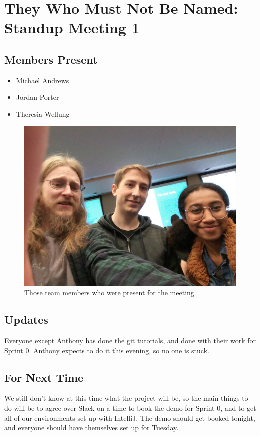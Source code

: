 \documentclass[11pt,letterpaper,oneside]{article}
\begin{document}
\section*{They Who Must Not Be Named: \\ Standup Meeting 1}

\subsection*{Members Present}
\begin{itemize}
\item Michael Andrews
\item Jordan Porter
\item Theresia Wellung
\end{itemize}

\begin{figure}[H]
	\includegraphics[angle=180, width=\linewidth]{20191017_171140.jpg}
	\caption{Those team members who were present for the meeting.}
\end{figure}

\subsection*{Updates}

Everyone except Anthony has done the git tutorials, and done with their work for Sprint 0.  Anthony expects to do it this evening, so no one is stuck.

\subsection*{For Next Time}

We still don't know at this time what the project will be, so the main things to do will be to agree over Slack on a time to book the demo for Sprint 0, and to get all of our environments set up with IntelliJ.  The demo should get booked tonight, and everyone should have themselves set up for Tuesday.
\end{document}
